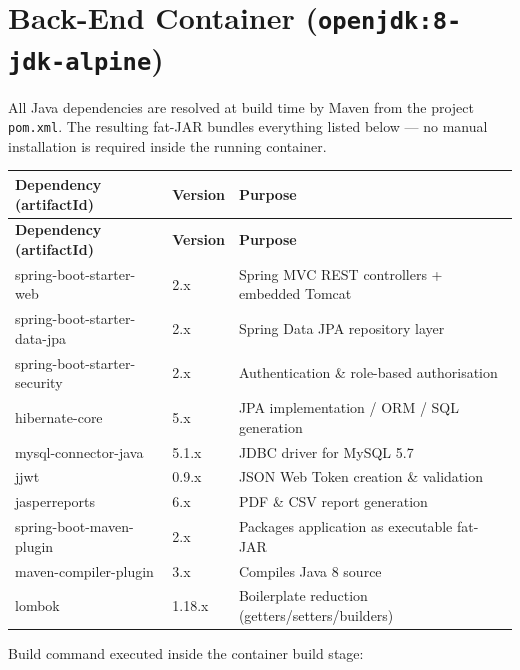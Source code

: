 \documentclass[12pt,letterpaper]{article}
\begin{document}
\section{Back-End Container \textnormal{\small(\texttt{openjdk:8-jdk-alpine})}}

All Java dependencies are resolved at build time by Maven from the project
\texttt{pom.xml}. The resulting fat-JAR bundles everything listed below —
no manual installation is required inside the running container.

\vspace{0.5em}
\begin{longtable}{p{5.5cm} p{1.8cm} p{6cm}}
  \rowcolor{headerblue}
  \color{white}\textbf{Dependency (artifactId)} &
  \color{white}\textbf{Version} &
  \color{white}\textbf{Purpose} \\
  \endfirsthead
  \rowcolor{headerblue}
  \color{white}\textbf{Dependency (artifactId)} &
  \color{white}\textbf{Version} &
  \color{white}\textbf{Purpose} \\
  \endhead
  spring-boot-starter-web       & 2.x    & Spring MVC REST controllers + embedded Tomcat \\
  \rowcolor{rowshade}
  spring-boot-starter-data-jpa  & 2.x    & Spring Data JPA repository layer \\
  spring-boot-starter-security  & 2.x    & Authentication \& role-based authorisation \\
  \rowcolor{rowshade}
  hibernate-core                & 5.x    & JPA implementation / ORM / SQL generation \\
  mysql-connector-java          & 5.1.x  & JDBC driver for MySQL 5.7 \\
  \rowcolor{rowshade}
  jjwt                          & 0.9.x  & JSON Web Token creation \& validation \\
  jasperreports                 & 6.x    & PDF \& CSV report generation \\
  \rowcolor{rowshade}
  spring-boot-maven-plugin      & 2.x    & Packages application as executable fat-JAR \\
  maven-compiler-plugin         & 3.x    & Compiles Java 8 source \\
  \rowcolor{rowshade}
  lombok                        & 1.18.x & Boilerplate reduction (getters/setters/builders) \\
\end{longtable}

\vspace{0.5em}
Build command executed inside the container build stage:
\end{document}
